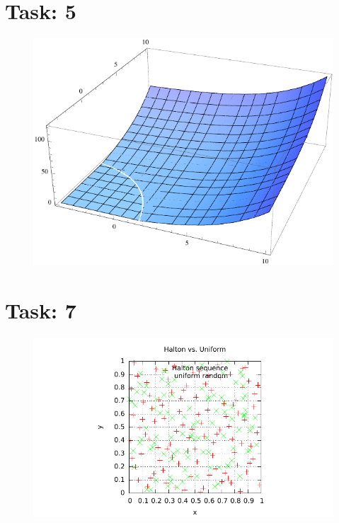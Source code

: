 \documentclass{article}
\begin{document}
\section*{Task: 5}

\begin{figure}[htbp]
  \centering
     \includegraphics[width=1.0\textwidth]{../Task05/sh3_task5_arithmetic_payoff.pdf}
\end{figure}

\section*{Task: 7}

\begin{figure}[htbp]
  \centering
     \includegraphics[width=1.0\textwidth]{../Task07/sh3_task7_point_plot.pdf}
\end{figure}
\end{document}
